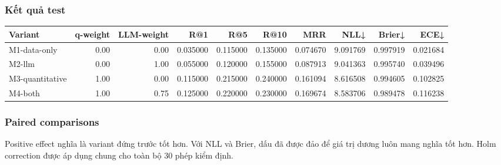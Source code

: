 \subsubsection*{Kết quả test}

\begin{table}[!htbp]
\centering
\scriptsize
\setlength{\tabcolsep}{2.5pt}
\begin{adjustbox}{max width=\textwidth}
\begin{tabular}{@{}lrrrrrrrrr@{}}
\toprule
Variant & q-weight & LLM-weight & R@1 & R@5 & R@10 & MRR & NLL↓ & Brier↓ & ECE↓ \\
\midrule
M1-data-only & 0.00 & 0.00 & 0.035000 & 0.115000 & 0.135000 & 0.074670 & 9.091769 & 0.997919 & 0.021684 \\
M2-llm & 0.00 & 1.00 & 0.055000 & 0.120000 & 0.155000 & 0.087913 & 9.041363 & 0.995740 & 0.039496 \\
M3-quantitative & 1.00 & 0.00 & 0.115000 & 0.215000 & 0.240000 & 0.161094 & 8.616508 & 0.994605 & 0.102825 \\
M4-both & 1.00 & 0.75 & 0.125000 & 0.220000 & 0.230000 & 0.169674 & 8.583706 & 0.989478 & 0.116238 \\
\bottomrule
\end{tabular}
\end{adjustbox}
\end{table}

\subsubsection*{Paired comparisons}

Positive effect nghĩa là variant đứng trước tốt hơn. Với NLL và Brier, dấu đã được đảo để giá trị dương luôn mang nghĩa tốt hơn. Holm correction được áp dụng chung cho toàn bộ 30 phép kiểm định.

